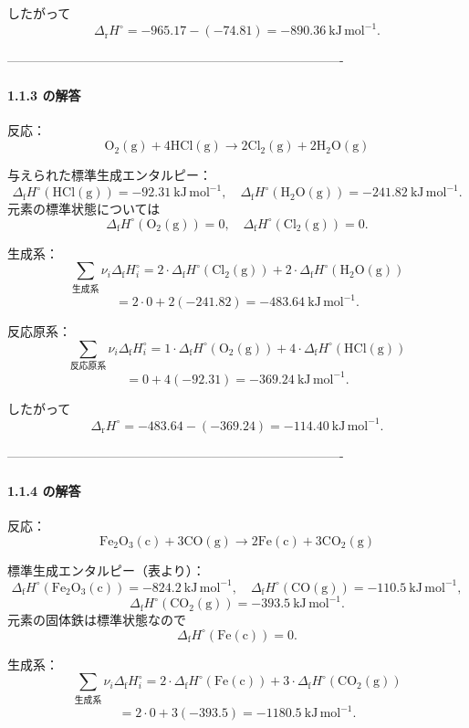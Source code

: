 \documentclass[a4paper,12pt]{jlreq}
\begin{document}
したがって
\[
\Delta_{\mathrm r}H^\circ
= -965.17 - (-74.81)
= -890.36\ \mathrm{kJ\,mol^{-1}}.
\]

-------------------------------------------------------------------------------

\paragraph{1.1.3 の解答}

反応：
\[
\mathrm{O_2(g) + 4HCl(g) \rightarrow 2Cl_2(g) + 2H_2O(g)}
\]

与えられた標準生成エンタルピー：
\[
\Delta_{\mathrm f}H^\circ(\mathrm{HCl(g)}) = -92.31\ \mathrm{kJ\,mol^{-1}},
\quad
\Delta_{\mathrm f}H^\circ(\mathrm{H_2O(g)}) = -241.82\ \mathrm{kJ\,mol^{-1}}.
\]
元素の標準状態については
\[
\Delta_{\mathrm f}H^\circ(\mathrm{O_2(g)}) = 0,\quad
\Delta_{\mathrm f}H^\circ(\mathrm{Cl_2(g)}) = 0.
\]

生成系：
\[
\sum_{\text{生成系}} \nu_i \Delta_{\mathrm f}H_i^\circ
= 2\cdot\Delta_{\mathrm f}H^\circ(\mathrm{Cl_2(g)})
  + 2\cdot\Delta_{\mathrm f}H^\circ(\mathrm{H_2O(g)})
\]
\[
= 2\cdot 0 + 2(-241.82)
= -483.64\ \mathrm{kJ\,mol^{-1}}.
\]

反応原系：
\[
\sum_{\text{反応原系}} \nu_i \Delta_{\mathrm f}H_i^\circ
= 1\cdot\Delta_{\mathrm f}H^\circ(\mathrm{O_2(g)})
  + 4\cdot\Delta_{\mathrm f}H^\circ(\mathrm{HCl(g)})
\]
\[
= 0 + 4(-92.31)
= -369.24\ \mathrm{kJ\,mol^{-1}}.
\]

したがって
\[
\Delta_{\mathrm r}H^\circ
= -483.64 - (-369.24)
= -114.40\ \mathrm{kJ\,mol^{-1}}.
\]

-------------------------------------------------------------------------------

\paragraph{1.1.4 の解答}

反応：
\[
\mathrm{Fe_2O_3(c) + 3CO(g) \rightarrow 2Fe(c) + 3CO_2(g)}
\]

標準生成エンタルピー（表より）：
\[
\Delta_{\mathrm f}H^\circ(\mathrm{Fe_2O_3(c)}) = -824.2\ \mathrm{kJ\,mol^{-1}},
\quad
\Delta_{\mathrm f}H^\circ(\mathrm{CO(g)}) = -110.5\ \mathrm{kJ\,mol^{-1}},
\]
\[
\Delta_{\mathrm f}H^\circ(\mathrm{CO_2(g)}) = -393.5\ \mathrm{kJ\,mol^{-1}}.
\]
元素の固体鉄は標準状態なので
\[
\Delta_{\mathrm f}H^\circ(\mathrm{Fe(c)}) = 0.
\]

生成系：
\[
\sum_{\text{生成系}} \nu_i \Delta_{\mathrm f}H_i^\circ
= 2\cdot\Delta_{\mathrm f}H^\circ(\mathrm{Fe(c)})
  + 3\cdot\Delta_{\mathrm f}H^\circ(\mathrm{CO_2(g)})
\]
\[
= 2\cdot 0 + 3(-393.5)
= -1180.5\ \mathrm{kJ\,mol^{-1}}.
\]
\end{document}
